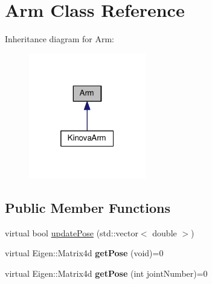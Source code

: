 \hypertarget{class_arm}{}\section{Arm Class Reference}
\label{class_arm}


Inheritance diagram for Arm\+:\nopagebreak
\begin{figure}[H]
\begin{center}
\leavevmode
\includegraphics[width=145pt]{class_arm__inherit__graph}
\end{center}
\end{figure}
\subsection*{Public Member Functions}
\begin{DoxyCompactItemize}
\item 
virtual bool \hyperlink{class_arm_abc38e64d0f6f3ea416626208baefa28d}{update\+Pose} (std\+::vector$<$ double $>$)
\item 
virtual Eigen\+::\+Matrix4d {\bfseries get\+Pose} (void)=0\hypertarget{class_arm_af89cd963a4321584dfb8f9715c02f5be}{}\label{class_arm_af89cd963a4321584dfb8f9715c02f5be}

\item 
virtual Eigen\+::\+Matrix4d {\bfseries get\+Pose} (int joint\+Number)=0\hypertarget{class_arm_a05162e055412fc6dc69ce74884f9fa6f}{}\label{class_arm_a05162e055412fc6dc69ce74884f9fa6f}

\end{DoxyCompactItemize}
